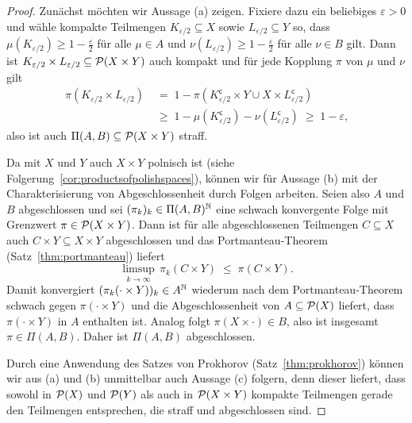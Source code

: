 \documentclass[../main/main.tex]{subfiles}
\begin{document}
	\begin{proof}
		Zunächst möchten wir Aussage (a) zeigen. Fixiere dazu ein beliebiges $\varepsilon > 0 $ und wähle kompakte Teilmengen $K_{\varepsilon/2} \subseteq X$ sowie $L_{\varepsilon/2} \subseteq Y$ so, dass $\mu(K_{\varepsilon/2}) \geq 1 - \frac{\varepsilon}{2}$ 
		für alle $\mu \in A$ und $\nu(L_{\varepsilon/2}) \geq 1 - \frac{\varepsilon}{2}$ für alle $\nu \in B$ gilt. Dann ist $K_{\varepsilon/2} \times L_{\varepsilon/2} \subseteq \mathcal{P}(X \times Y)$ auch kompakt und für jede Kopplung $\pi$ von $\mu$ und $\nu$ gilt
		\begin{align*}
			\pi(K_{\varepsilon/2} \times L_{\varepsilon/2}) \; &= \; 1 - \pi(K_{\varepsilon/2}^\mathsf{c} \times Y \cup X \times L_{\varepsilon/2}^\mathsf{c}) \\
			&\geq \; 1 - \mu(K_{\varepsilon/2}^\mathsf{c}) - \nu(L_{\varepsilon/2}^\mathsf{c}) \; \geq \; 1 - \varepsilon \text{,}
		\end{align*}
		also ist auch $\Pi(A, B) \subseteq \mathcal{P}(X \times Y)$ straff.
		
		Da mit $X$ und $Y$ auch $X \times Y$ polnisch ist (siehe Folgerung~\ref{cor:productsofpolishspaces}), können wir für Aussage (b) mit der Charakterisierung von Abgeschlossenheit durch Folgen arbeiten.
		Seien also $A$ und $B$ abgeschlossen und sei $(\pi_k)_k \in \Pi(A, B)^{\mathbb{N}}$ eine schwach konvergente Folge mit Grenzwert $\pi \in \mathcal{P}(X \times Y)$.
		Dann ist für alle abgeschlossenen Teilmengen $C \subseteq X$ auch $C \times Y \subseteq X \times Y$ abgeschlossen und das Portmanteau-Theorem (Satz~\ref{thm:portmanteau}) liefert
		\[ \limsup_{k \to \infty} \, \pi_k(C \times Y) \; \leq \; \pi(C \times Y) \text{.} \]
		Damit konvergiert $(\pi_k(\cdot \times Y))_k \in A^{\mathbb{N}}$ wiederum nach dem Portmanteau-Theorem schwach gegen $\pi(\cdot \times Y)$ und die Abgeschlossenheit 
		von $A \subseteq \mathcal{P}(X)$ liefert, dass $\pi(\cdot \times Y)$ in $A$
		enthalten ist. Analog folgt $\pi(X \times \cdot) \in B$, also ist insgesamt $\pi \in \Pi(A, B)$. Daher ist $\Pi(A, B)$ abgeschlossen.
		
		Durch eine Anwendung des Satzes von Prokhorov (Satz~\ref{thm:prokhorov}) können wir aus (a) und (b) unmittelbar auch Aussage (c) folgern, denn dieser liefert, dass sowohl in $\mathcal{P}(X)$ und $\mathcal{P}(Y)$ als auch in $\mathcal{P}(X \times Y)$ kompakte Teilmengen gerade den Teilmengen entsprechen, die straff und abgeschlossen sind.
	\end{proof}
\end{document}
